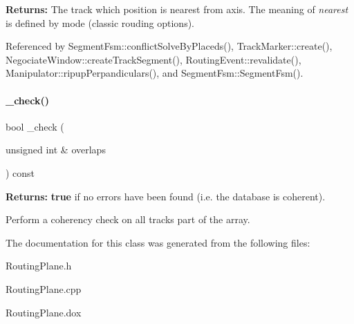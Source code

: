 {\bfseries Returns\+:} The track which position is nearest from {\ttfamily axis}. The meaning of {\itshape nearest} is defined by {\ttfamily mode} (classic rouding options). 

Referenced by Segment\+Fsm\+::conflict\+Solve\+By\+Placeds(), Track\+Marker\+::create(), Negociate\+Window\+::create\+Track\+Segment(), Routing\+Event\+::revalidate(), Manipulator\+::ripup\+Perpandiculars(), and Segment\+Fsm\+::\+Segment\+Fsm().

\mbox{\label{classKite_1_1RoutingPlane_aeea9a19f9b402ffe42c011c9afc2ca73}} 
\paragraph{\texorpdfstring{\+\_\+check()}{\_check()}}
{\footnotesize\ttfamily bool \+\_\+check (\begin{DoxyParamCaption}\item[{unsigned int \&}]{overlaps }\end{DoxyParamCaption}) const}

{\bfseries Returns\+:} {\bfseries true} if no errors have been found (i.\+e. the database is coherent).

Perform a coherency check on all tracks part of the array. 

The documentation for this class was generated from the following files\+:\begin{DoxyCompactItemize}
\item 
Routing\+Plane.\+h\item 
Routing\+Plane.\+cpp\item 
Routing\+Plane.\+dox\end{DoxyCompactItemize}
